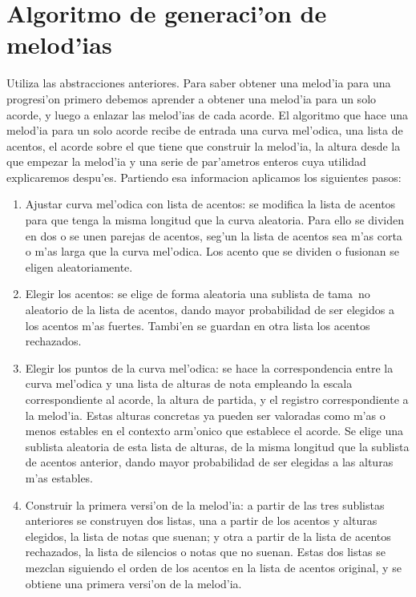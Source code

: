 \section{Algoritmo de generaci'on de melod'ias}
Utiliza las abstracciones anteriores. Para saber obtener una melod'ia para una progresi'on primero debemos aprender a obtener una melod'ia para un solo acorde, y luego a enlazar las melod'ias de cada acorde.
\newline
El algoritmo que hace una melod'ia para un solo acorde recibe de entrada una curva mel'odica, una lista de acentos, el acorde sobre el que tiene que construir la melod'ia, la altura desde la que empezar la melod'ia y una serie de par'ametros enteros cuya utilidad explicaremos despu'es. Partiendo esa informacion aplicamos los siguientes pasos:
        \begin{enumerate}
        \item Ajustar curva mel'odica con lista de acentos: se modifica la lista de acentos para que tenga la misma longitud que la curva aleatoria. Para ello se dividen en dos o se unen parejas de acentos, seg'un la lista de acentos sea m'as corta o m'as larga que la curva mel'odica. Los acento que se dividen o fusionan se eligen aleatoriamente.
        \item Elegir los acentos: se elige de forma aleatoria una sublista de tama~no aleatorio de la lista de acentos, dando mayor probabilidad de ser elegidos a los acentos m'as fuertes. Tambi'en se guardan en otra lista los acentos rechazados.
        \item Elegir los puntos de la curva mel'odica: se hace la correspondencia entre la curva mel'odica y una lista de alturas de nota empleando la escala correspondiente al acorde, la altura de partida, y el registro correspondiente a la melod'ia. Estas alturas concretas ya pueden ser valoradas como m'as o menos estables en el contexto arm'onico que establece el acorde. Se elige una sublista aleatoria de esta lista de alturas, de la misma longitud que la sublista de acentos anterior, dando mayor probabilidad de ser elegidas a las alturas m'as estables.
        \item Construir la primera versi'on de la melod'ia: a partir de las tres sublistas anteriores se construyen dos listas, una a partir de los acentos y alturas elegidos, la lista de notas que suenan; y otra a partir de la lista de acentos rechazados, la lista de silencios o notas que no suenan. Estas dos listas se mezclan siguiendo el orden de los acentos en la lista de acentos original, y se obtiene una primera versi'on de la melod'ia.

\end{enumerate}
